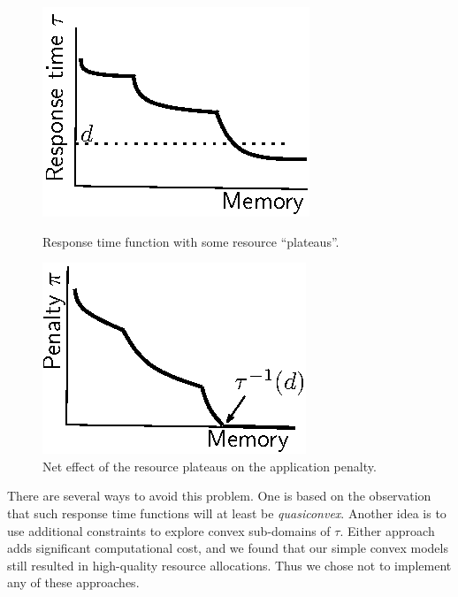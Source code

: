 \begin{figure}[hb]
\parbox{3in}{
\includegraphics*[width=.45\columnwidth]{Figures/Plateau1.eps}
\caption{\label{f:plat}Response time function with some resource ``plateaus''.}
}
\hspace{\fill}
\parbox{3in}{
\includegraphics*[width=.45\columnwidth]{Figures/Plateau2.eps}
\caption{\label{f:plateffect}Net effect of the resource plateaus on the application penalty.}
}
\end{figure}

There are several ways to avoid this problem.  One is based on the observation that such response time functions will at least be \emph{quasiconvex}.  Another idea is to use additional constraints to explore convex sub-domains of $\tau$. Either approach adds significant computational cost, and we found that our simple convex models still resulted in high-quality resource allocations. Thus we chose not to implement any of these approaches.  




